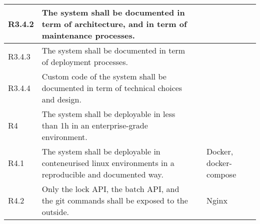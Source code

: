 \begin{landscape}
\begin{longtable}{|p{1cm}|p{19cm}|p{2cm}|p{3cm}|}
        R3.4.2                              & The system shall be documented in term of architecture, and in term of maintenance processes.                                                                                                                                                                                         &                       &                                          \\\hline
        R3.4.3                              & The system shall be documented in term of deployment processes.                                                                                                                                                                                                                       &                       &                                          \\\hline
        R3.4.4                              & Custom code of the system shall be documented in term of technical choices and design.                                                                                                                                                                                                &                       &                                          \\\hline
        \rowcolor[HTML]{C0C0C0}        R4   & The system shall be deployable in less than 1h in an enterprise-grade environment.                                                                                                                                                                                                    &                       &                                          \\ \hline
        \rowcolor[HTML]{DDDDDD}        R4.1 & The system shall be deployable in conteneurised linux environments in a reproducible and documented way.                                                                                                                                                                              &                       & Docker, docker-compose                   \\ \hline
        \rowcolor[HTML]{DDDDDD}        R4.2 & Only the lock API, the batch API, and the git commands shall be exposed to the outside.                                                                                                                                                                                               &                       & Nginx                                    \\ \hline

\end{longtable}
\end{landscape}
